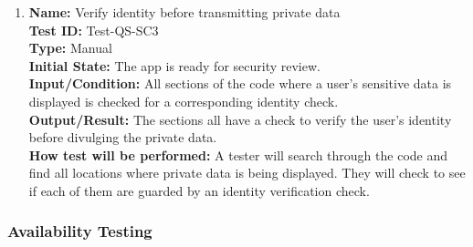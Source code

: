 \documentclass[12pt, titlepage]{article}
\begin{document}
\begin{enumerate}
    \item
    \textbf{Name:} Verify identity before transmitting private data \label{itm:Test-QS-SC3} \\
    \textbf{Test ID:} Test-QS-SC3 \\
    \textbf{Type:} Manual \\
    \textbf{Initial State:} The app is ready for security review. \\
    \textbf{Input/Condition:} All sections of the code where a user's sensitive data is displayed is checked for a corresponding identity check. \\
    \textbf{Output/Result:} The sections all have a check to verify the user's identity before divulging the private data. \\
    \textbf{How test will be performed:} A tester will search through the code and find all locations where private data is being displayed. They will check to see if each of them are guarded by an identity verification check.

\end{enumerate}
\subsubsection{Availability Testing}
\end{document}
